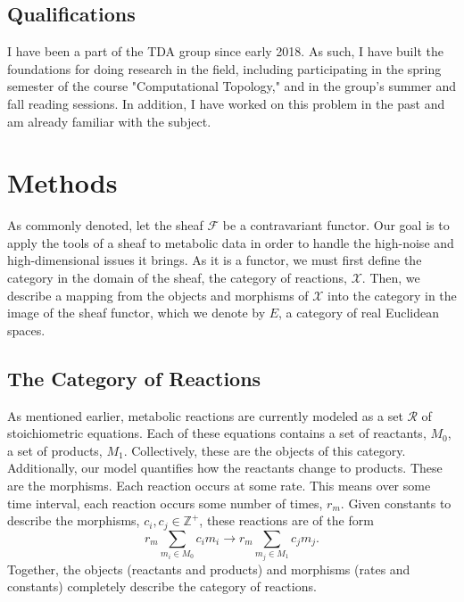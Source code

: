 \documentclass[10.5pt]{article}
\begin{document}
\subsection{Qualifications}
I have been a part of the TDA group since early 2018. As such, I have built the foundations for doing research in the field, including participating in the spring semester of the course "Computational Topology," and in the group's summer and fall reading sessions. In addition, I have worked on this problem in the past and am already familiar with the subject.


\section{Methods}

As commonly denoted, let the sheaf $\mathscr{F}$ be a
contravariant functor. Our goal is to apply the tools of a sheaf to metabolic data in order to handle the high-noise and high-dimensional issues it brings. As it is a functor, we must first define the category in the domain of the sheaf, the
category of reactions, $\mathcal{X}$. Then, we describe a mapping from the
objects and morphisms of $\mathcal{X}$ into the category in the image of the
sheaf functor, which we denote by $E$, a category of real Euclidean spaces. 

\subsection{The Category of Reactions}
As mentioned earlier, metabolic reactions are currently modeled as a set $\mathcal{R}$ of stoichiometric equations. Each of these equations contains a set of reactants, $M_0$, a set of products, $M_1$. Collectively, these are the objects of this category. Additionally, our model quantifies how the reactants change to products. These are the morphisms. Each reaction occurs at some rate. This means over some time interval, each reaction occurs some number of times, $r_m$. Given constants to describe the morphisms, $c_i,c_j \in \mathbb{Z}^+$, these reactions are of the form \begin{equation}
r_m\sum_{m_i \in M_0} c_i m_i \rightarrow r_m\sum_{m_j \in M_1} c_j m_j .
\end{equation}  
Together, the objects (reactants and products) and morphisms (rates and constants) completely describe the category of reactions.
\end{document}
